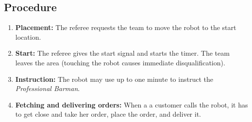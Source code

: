\subsection*{Procedure}
\begin{enumerate}[nosep]
	\item \textbf{Placement:} The referee requests the team to move the robot to the start location.
	\item \textbf{Start:} The referee gives the start signal and starts the timer. The team leaves the area (touching the robot causes immediate disqualification).
	\item \textbf{Instruction:} The robot may use up to one minute to instruct the \textit{Professional Barman}.
	\item \textbf{Fetching and delivering orders:} When a a customer calls the robot, it has to get close and take her order, place the order, and deliver it.
\end{enumerate}


